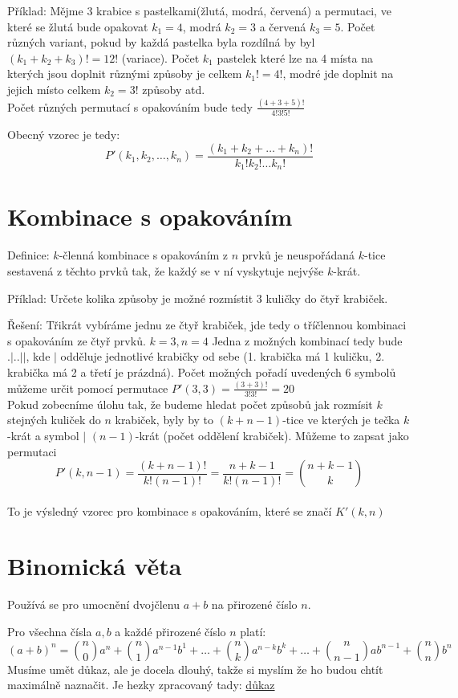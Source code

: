 \documentclass[12pt]{article}
\begin{document}
Příklad: Mějme 3 krabice s pastelkami(žlutá, modrá, červená) a permutaci, ve které se žlutá bude opakovat $k_1 = 4$, modrá $k_2 = 3$ a červená $k_3 = 5$. Počet různých variant, pokud by každá pastelka byla rozdílná by byl $(k_1 + k_2 + k_3)! = 12!$ (variace). Počet $k_1$ pastelek které lze na 4 místa na kterých jsou doplnit různými způsoby je celkem $k_1! = 4!$, modré jde doplnit na jejich místo celkem $k_2 = 3!$ způsoby atd.\\
Počet různých permutací s opakováním bude tedy $\frac{(4 + 3 + 5)!}{4!3!5!}$

Obecný vzorec je tedy:
\[P'(k_1, k_2, \dots, k_n) = \frac{(k_1 + k_2 +\dots + k_n)!}{k_1!k_2!\dots k_n!}\]

\section*{Kombinace s opakováním}
Definice: $k$-členná kombinace s opakováním z $n$ prvků je neuspořádaná $k$-tice sestavená z těchto prvků tak, že každý se v ní vyskytuje nejvýše $k$-krát.

Příklad: Určete kolika způsoby je možné rozmístit 3 kuličky do čtyř krabiček.

Řešení: Třikrát vybíráme jednu ze čtyř krabiček, jde tedy o tříčlennou kombinaci s opakováním ze čtyř prvků. $k = 3, n = 4$
Jedna z možných kombinací tedy bude $.|..||$, kde $|$ odděluje jednotlivé krabičky od sebe (1. krabička má 1 kuličku, 2. krabička má 2 a třetí je prázdná). Počet možných pořadí uvedených 6 symbolů můžeme určit pomocí permutace $P'(3,3) = \frac{(3+3)!}{3!3!} = 20$\\
Pokud zobecníme úlohu tak, že budeme hledat počet způsobů jak rozmísit $k$ stejných kuliček do $n$ krabiček, byly by to $(k+n-1)$-tice ve kterých je tečka $k$-krát a symbol $|$ $(n-1)$-krát (počet oddělení krabiček). Můžeme to zapsat jako permutaci 
\[P'(k,n-1) = \frac{(k+n-1)!}{k!(n-1)!} = \frac{n+k-1}{k!(n-1)!} = \binom{n+k-1}{k}\]\\
To je výsledný vzorec pro kombinace s opakováním, které se značí $K'(k,n)$

\section*{Binomická věta}
Používá se pro umocnění dvojčlenu $a + b$ na přirozené číslo $n$.

Pro všechna čísla $a,b$ a každé přirozené číslo $n$ platí:
\[(a+b)^n = \binom{n}{0}a^n +  \binom{n}{1}a^{n-1}b^1 + \dots + \binom{n}{k}a^{n-k}b^k + \dots + \binom{n}{n-1}ab^{n-1} + \binom{n}{n}b^n\]
Musíme umět důkaz, ale je docela dlouhý, takže si myslím že ho budou chtít maximálně naznačit. Je hezky zpracovaný tady: \href{https://www2.karlin.mff.cuni.cz/~portal/kombinatorika/index.php?page=04binomicka_veta}{\color{blue}důkaz}
\end{document}
